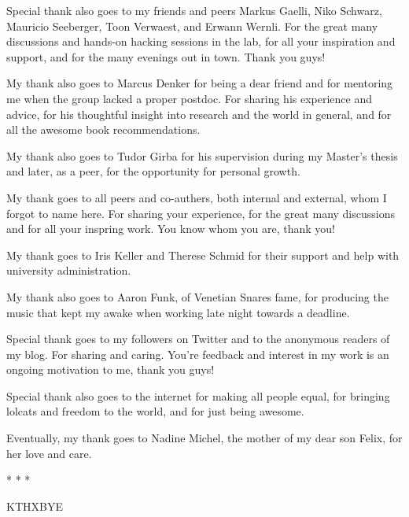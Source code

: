 Special thank also goes to my friends and peers Markus Gaelli, Niko Schwarz, Mauricio Seeberger, Toon Verwaest, and Erwann Wernli. For the great many discussions and hands-on hacking sessions in the lab, for all your inspiration and support, and for the many evenings out in town.  Thank you guys!

My thank also goes to Marcus Denker for being a dear friend and for mentoring me when the group lacked a proper postdoc. For sharing his experience and advice, for his thoughtful insight into research and the world in general, and for all the awesome book recommendations. 

My thank also goes to Tudor Girba for his supervision during my Master's thesis and later, as a peer, for the opportunity for personal growth.

My thank goes to all peers and co-authers, both internal and external, whom I forgot to name here. For sharing your experience, for the great many discussions and for all your inspring work. You know whom you are, thank you!

My thank goes to Iris Keller and Therese Schmid for their support and help with university administration.

My thank also goes to Aaron Funk, of Venetian Snares fame, for producing the music that kept my awake when working late night towards a deadline. 

Special thank goes to my followers on Twitter and to the anonymous readers of my blog. For sharing and caring. You're feedback and interest in my work is an ongoing motivation to me, thank you guys!

Special thank also goes to the internet for making all people equal, for bringing lolcats and freedom to the world, and for just being awesome.

Eventually, my thank goes to Nadine Michel, the mother of my dear son Felix, for her love and care. 

\begin{center}* * *\end{center}

KTHXBYE